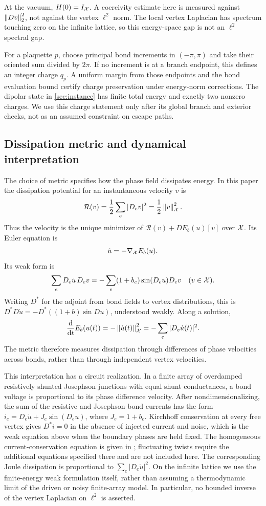 At the vacuum, $H(0)=I_\mathcal X$. A coercivity estimate here is measured against $\left\lVert Dv\right\rVert_2^2$, not against the vertex $\ell^2$ norm. The local vertex Laplacian has spectrum touching zero on the infinite lattice, so this energy-space gap is not an $\ell^2$ spectral gap.

For a plaquette $p$, choose principal bond increments in $(-\pi,\pi)$ and take their oriented sum divided by $2\pi$. If no increment is at a branch endpoint, this defines an integer charge $q_p$. A uniform margin from those endpoints and the bond evaluation bound certify charge preservation under energy-norm corrections. The dipolar state in \cref{sec:instance} has finite total energy and exactly two nonzero charges. We use this charge statement only after its global branch and exterior checks, not as an assumed constraint on escape paths.

\subsection{Dissipation metric and dynamical interpretation}

The choice of metric specifies how the phase field dissipates energy. In
this paper the dissipation potential for an instantaneous velocity $v$ is
\[
 \mathcal R(v)=\frac12\sum_e|D_ev|^2
             =\frac12\left\lVert v\right\rVert_\mathcal X^2.
\]
Thus the velocity is the unique minimizer of
$\mathcal R(v)+DE_b(u)[v]$ over $\mathcal X$. Its Euler equation is
\begin{equation}\label{eq:flow}
 \dot u=-\nabla_\mathcal X E_b(u).
\end{equation}
Its weak form is
\begin{equation}\label{eq:flow-weak}
 \sum_eD_e\dot u\,D_ev
       =-\sum_e(1+b_e)\sin(D_eu)D_ev
       \quad(v\in\mathcal X).
\end{equation}
Writing $D^*$ for the adjoint from bond fields to vertex distributions,
this is $D^*D\dot u=-D^*((1+b)\sin Du)$, understood weakly. Along a
solution,
\[
 \frac{\mathrm d}{\mathrm dt}E_b(u(t))
   =-\left\lVert\dot u(t)\right\rVert_\mathcal X^2=-\sum_e|D_e\dot u(t)|^2.
\]
The metric therefore measures dissipation through differences of phase
velocities across bonds, rather than through independent vertex velocities.

This interpretation has a circuit realization. In a finite array of
overdamped resistively shunted Josephson junctions with equal shunt
conductances, a bond voltage is proportional to its phase difference
velocity. After nondimensionalizing, the sum of the resistive and
Josephson bond currents has the form
$i_e=D_e\dot u+J_e\sin(D_eu)$, where $J_e=1+b_e$.
Kirchhoff conservation at every free vertex gives $D^*i=0$ in the absence
of injected current and noise, which is the weak equation above when
the boundary phases are held fixed. The homogeneous current-conservation
equation is given in \cite[Eq.~(13)]{Yoon2000}; fluctuating twists require
the additional equations specified there and are not included here.
The corresponding Joule dissipation is proportional to
$\sum_e|D_e\dot u|^2$. On the infinite lattice we use the finite-energy
weak formulation itself, rather than assuming a thermodynamic limit of
the driven or noisy finite-array model. In particular, no bounded
inverse of the vertex Laplacian on $\ell^2$ is asserted.

